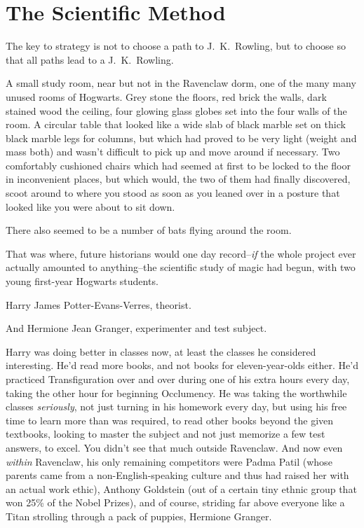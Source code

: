 \chapter{The Scientific Method}

\begin{chapterOpeningAuthorNote}
The key to strategy is not to choose a path to J.~K.~Rowling, but to choose so that all paths lead to a J.~K.~Rowling.
\end{chapterOpeningAuthorNote}

\lettrine{A}{} small study room, near but not in the Ravenclaw dorm, one of the many many unused rooms of Hogwarts. Grey stone the floors, red brick the walls, dark stained wood the ceiling, four glowing glass globes set into the four walls of the room. A circular table that looked like a wide slab of black marble set on thick black marble legs for columns, but which had proved to be very light (weight and mass both) and wasn't difficult to pick up and move around if necessary. Two comfortably cushioned chairs which had seemed at first to be locked to the floor in inconvenient places, but which would, the two of them had finally discovered, scoot around to where you stood as soon as you leaned over in a posture that looked like you were about to sit down.

There also seemed to be a number of bats flying around the room.

That was where, future historians would one day record\---\emph{if} the whole project ever actually amounted to anything\---the scientific study of magic had begun, with two young first-year Hogwarts students.

Harry James Potter-Evans-Verres, theorist.

And Hermione Jean Granger, experimenter and test subject.

Harry was doing better in classes now, at least the classes he considered interesting. He'd read more books, and not books for eleven-year-olds either. He'd practiced Transfiguration over and over during one of his extra hours every day, taking the other hour for beginning Occlumency. He was taking the worthwhile classes \emph{seriously}, not just turning in his homework every day, but using his free time to learn more than was required, to read other books beyond the given textbooks, looking to master the subject and not just memorize a few test answers, to excel. You didn't see that much outside Ravenclaw. And now even \emph{within} Ravenclaw, his only remaining competitors were Padma Patil (whose parents came from a non-English-speaking culture and thus had raised her with an actual work ethic), Anthony Goldstein (out of a certain tiny ethnic group that won 25\% of the Nobel Prizes), and of course, striding far above everyone like a Titan strolling through a pack of puppies, Hermione Granger.


